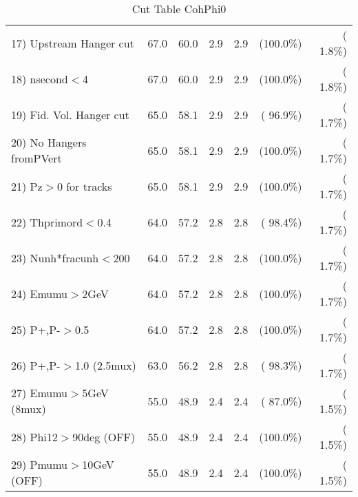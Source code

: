 \begin{table}[h!]
\begin{tabular}{||l||r|r|r|r|r|r||}
 17) Upstream Hanger cut  &         67.0 &         60.0 &          2.9 &          2.9 & (100.0\%) & (  1.8\%) \\
 18) nsecond$<$4          &         67.0 &         60.0 &          2.9 &          2.9 & (100.0\%) & (  1.8\%) \\
 19) Fid. Vol. Hanger cut &         65.0 &         58.1 &          2.9 &          2.9 & ( 96.9\%) & (  1.7\%) \\
 20) No Hangers fromPVert &         65.0 &         58.1 &          2.9 &          2.9 & (100.0\%) & (  1.7\%) \\
 21) Pz$>$0 for tracks    &         65.0 &         58.1 &          2.9 &          2.9 & (100.0\%) & (  1.7\%) \\
 22) Thprimord$<$0.4      &         64.0 &         57.2 &          2.8 &          2.8 & ( 98.4\%) & (  1.7\%) \\
 23) Nunh*fracunh$<$200   &         64.0 &         57.2 &          2.8 &          2.8 & (100.0\%) & (  1.7\%) \\
 24) Emumu$>$2GeV         &         64.0 &         57.2 &          2.8 &          2.8 & (100.0\%) & (  1.7\%) \\
 25) P+,P-$>$0.5          &         64.0 &         57.2 &          2.8 &          2.8 & (100.0\%) & (  1.7\%) \\
 26) P+,P-$>$1.0 (2.5mux) &         63.0 &         56.2 &          2.8 &          2.8 & ( 98.3\%) & (  1.7\%) \\
 27) Emumu$>$5GeV  (8mux) &         55.0 &         48.9 &          2.4 &          2.4 & ( 87.0\%) & (  1.5\%) \\
 28) Phi12$>$90deg  (OFF) &         55.0 &         48.9 &          2.4 &          2.4 & (100.0\%) & (  1.5\%) \\
 29) Pmumu$>$10GeV  (OFF) &         55.0 &         48.9 &          2.4 &          2.4 & (100.0\%) & (  1.5\%) \\
 \hline
 \hline
 \end{tabular}
 \caption{Cut Table  CohPhi0  }
 \label{tab-cutcohjpsi-mumu_cohphi0}
 \end{table}
